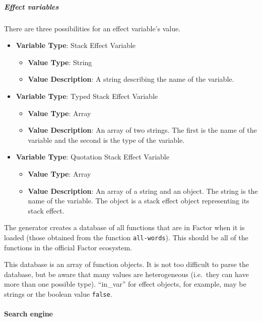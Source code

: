 \documentclass[
]{article}
\begin{document}
\hypertarget{effect-variables}{%
\subparagraph{Effect variables}\label{effect-variables}}

There are three possibilities for an effect variable's value.

\begin{itemize}
  \item \textbf{Variable Type}: Stack Effect Variable
    \begin{itemize}
      \item \textbf{Value Type}:
        String
      \item \textbf{Value Description}: 
        A string describing the name of the variable.
    \end{itemize}
  \item \textbf{Variable Type}: Typed Stack Effect Variable
    \begin{itemize}
      \item \textbf{Value Type}:
        Array
      \item \textbf{Value Description}: 
        An array of two strings. The first is the name of the variable and the
        second is the type of the variable.
    \end{itemize}
  \item \textbf{Variable Type}: Quotation Stack Effect Variable
    \begin{itemize}
      \item \textbf{Value Type}:
        Array
      \item \textbf{Value Description}: 
        An array of a string and an object. The string is the name of the
        variable. The object is a stack effect object representing its stack
        effect.
    \end{itemize}
\end{itemize}

The generator creates a database of all functions that are in Factor
when it is loaded (those obtained from the function \texttt{all-words}).
This should be all of the functions in the official Factor ecosystem.

This database is an array of function objects. It is not too difficult
to parse the database, but be aware that many values are heterogeneous
(i.e.~they can have more than one possible type). ``in\_var'' for effect
objects, for example, may be strings or the boolean value
\texttt{false}.

\hypertarget{search-engine}{%
\paragraph{Search engine}\label{search-engine}}
\end{document}
